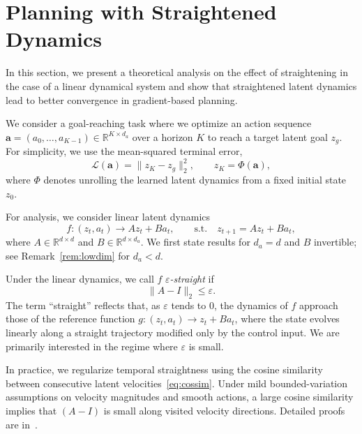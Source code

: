 \section{Planning with Straightened Dynamics}
\label{sec:theory}
In this section, we present a theoretical analysis on the effect of straightening in the case of a linear dynamical system and show that straightened latent dynamics lead to better convergence in gradient-based planning.

We consider a goal-reaching task where we optimize an action sequence
$\mathbf a=(a_0,\dots,a_{K-1})\in\mathbb R^{K\times d_a}$ over a horizon $K$ to reach a target latent goal $z_g$.
For simplicity, we use the mean-squared terminal error,
\begin{equation}\label{eq:obj}
\mathcal L(\mathbf a)=\|z_K-z_g\|_2^2,
\qquad
z_K=\Phi(\mathbf a),
\end{equation}
where $\Phi$ denotes unrolling the learned latent dynamics from a fixed initial state $z_0$.

\begin{assumption}\label{as:linear}
For analysis, we consider linear latent dynamics 
\begin{equation}\label{eq:linear}
f: (z_t, a_t) \to Az_t+Ba_t,
\qquad
\text{s.t.} \quad
z_{t+1}=Az_t+Ba_t,
\end{equation}
where $A\in\mathbb R^{d\times d}$ and $B\in\mathbb R^{d\times d_a}$. We first state results for $d_a=d$ and $B$ invertible; see Remark~\ref{rem:lowdim} for $d_a<d$.
\end{assumption}

\begin{definition}\label{def:eps}
Under the linear dynamics, we call $f$ \emph{$\varepsilon$-straight} if
\begin{equation}\label{eq:eps_def}
\|A-I\|_2 \leq \varepsilon.
\end{equation}
The term ``straight'' reflects that, as $\varepsilon$ tends to $0$, the dynamics of $f$ approach those of the reference function $g: (z_t, a_t) \to z_t+Ba_t$, where the state evolves linearly along a straight trajectory modified only by the control input. We are primarily interested in the regime where $\varepsilon$ is small.
\end{definition}

\begin{remark}\label{rem:cos_proxy}
In practice, we regularize temporal straightness using the cosine similarity between consecutive latent velocities~\eqref{eq:cossim}. Under mild bounded-variation assumptions on velocity magnitudes and smooth actions, a large
cosine similarity implies that $(A-I)$ is small along visited velocity directions. Detailed proofs are in~.
\end{remark}

